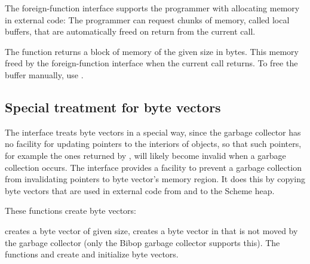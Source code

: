 The foreign-function interface supports the programmer with allocating
memory in external code: The programmer can request chunks of memory,
called local buffers, that are automatically freed on return from the
current call.

\begin{protos}
\end{protos}

The function  returns a block of memory of
the given size in bytes.  This memory freed by the foreign-function
interface when the current call returns.  To free the buffer manually,
use .

\subsection{Special treatment for byte vectors}
\label{sec:byte-vectors}

The interface treats byte vectors in a special way, since the garbage
collector has no facility for updating pointers to the interiors of
objects, so that such pointers, for example the ones returned by
, will likely become
invalid when a garbage collection occurs.  The interface provides a
facility to prevent a garbage collection from invalidating pointers to
byte vector's memory region.  It does this by copying byte vectors
that are used in external code from and to the Scheme heap.

These functions create byte vectors:

\begin{protos}
\end{protos}

 creates a byte vector of given size,
 creates a byte vector in
that is not moved by the garbage collector (only the Bibop garbage
collector supports this).  The functions
 and
 create and initialize
byte vectors.

